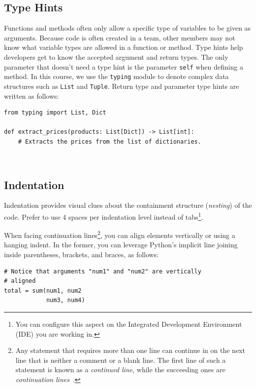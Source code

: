 \documentclass{tufte-handout}
\begin{document}
\subsection{Type Hints}
Functions and methods often only allow a specific type of variables to be given as arguments.
Because code is often created in a team, other members may not know what variable types are allowed in a function or method.
Type hints help developers get to know the accepted argument and return types.
The only parameter that doesn't need a type hint is the parameter \texttt{self} when defining a method.
In this course, we use the \texttt{typing} module to denote complex data structures such as \texttt{List} and \texttt{Tuple}.
Return type and parameter type hints are written as follows:

\begin{mdframed}
\begin{verbatim}
from typing import List, Dict

def extract_prices(products: List[Dict]) -> List[int]:
    # Extracts the prices from the list of dictionaries.
\end{verbatim}
\end{mdframed}

\


\subsection{Indentation}

Indentation provides visual clues about the containment structure (\emph{nesting\/}) of the code.
Prefer to use 4 spaces per indentation level instead of tabs\footnote{You can configure this aspect on the Integrated Development Environment (IDE) you are working in.}.

When facing continuation lines\footnote{Any statement that requires more than one line can continue in on the next line that is neither a comment or a blank line. The first line of such a statement is known as a \emph{continued line}, while the succeeding ones are \emph{continuation lines}~\cite{ibm2022continuation}.}, you can align elements vertically or using a hanging indent.
In the former, you can leverage Python's implicit line joining inside parentheses, brackets, and braces, as follows:

\begin{mdframed}
\begin{verbatim}
# Notice that arguments "num1" and "num2" are vertically 
# aligned
total = sum(num1, num2
            num3, num4)
\end{verbatim}
\end{mdframed}
\end{document}
